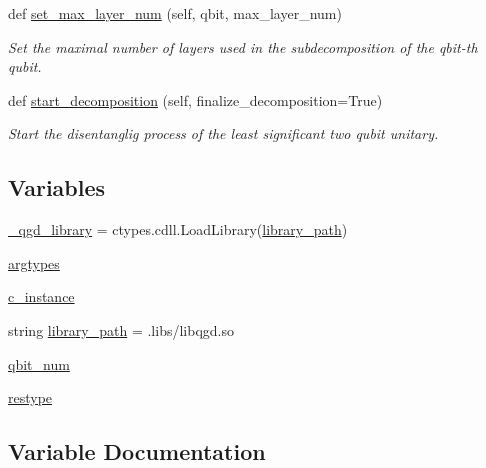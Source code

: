 \begin{DoxyCompactItemize}
def \hyperlink{group__python_ga194ae83da0f906220e3b001d1bac14bc}{set\+\_\+max\+\_\+layer\+\_\+num} (self, qbit, max\+\_\+layer\+\_\+num)
\begin{DoxyCompactList}\small\item\em Set the maximal number of layers used in the subdecomposition of the qbit-\/th qubit. \end{DoxyCompactList}\item 
def \hyperlink{group__python_ga0001a3a473bd31784f1da0d018a7529a}{start\+\_\+decomposition} (self, finalize\+\_\+decomposition=True)
\begin{DoxyCompactList}\small\item\em Start the disentanglig process of the least significant two qubit unitary. \end{DoxyCompactList}\end{DoxyCompactItemize}
\subsection*{Variables}
\begin{DoxyCompactItemize}
\item 
\hyperlink{group__python_gaab3ee0c640088387c37d0bea14b0bbd0}{\+\_\+qgd\+\_\+library} = ctypes.\+cdll.\+Load\+Library(\hyperlink{group__python_ga36e466ce872adb198d01ce19abdd3177}{library\+\_\+path})
\item 
\hyperlink{group__python_gacb3a3a21bbd6fbe8c612122ea586f1e9}{argtypes}
\item 
\hyperlink{namespaceqgd__python_1_1_n___qubit___decomposition_a61c44892ca8235f2a7e4bff2055677d6}{c\+\_\+instance}
\item 
string \hyperlink{group__python_ga36e466ce872adb198d01ce19abdd3177}{library\+\_\+path} = \textquotesingle{}.libs/libqgd.\+so\textquotesingle{}
\item 
\hyperlink{namespaceqgd__python_1_1_n___qubit___decomposition_ae24ab085d61812b01a6f7e1678941c65}{qbit\+\_\+num}
\item 
\hyperlink{group__python_ga9341b826d33e46599c99a2da15e9c2be}{restype}
\end{DoxyCompactItemize}


\subsection{Variable Documentation}
